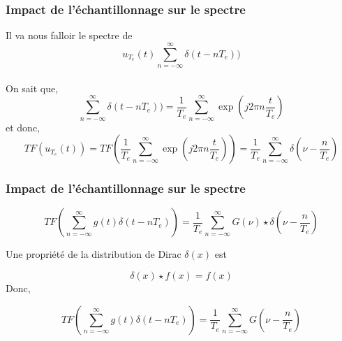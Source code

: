 \documentclass{beamer}
\begin{document}
\begin{frame}
\frametitle{Impact de l'échantillonnage sur le spectre}

Il va nous falloir le spectre de \[u_{T_e}(t) \sum_{n = -\infty}^{\infty} \delta(t-nT_e))\]
\\
\vspace{0.2cm}
On sait que,
 \[  \sum_{n = -\infty}^{\infty} \delta(t-nT_e)) =  \frac{1}{T_e}\sum_{n = -\infty}^{\infty} \exp(j2\pi n \frac{t}{T_e}) \]
et donc,
 \[ TF(u_{T_e}(t)) =  TF(\frac{1}{T_e}\sum_{n = -\infty}^{\infty} \exp(j2\pi n \frac{t}{T_e})) =  \frac{1}{T_e}\sum_{n = -\infty}^{\infty} \delta(\nu - \frac{n}{T_e}) \] 
 

\end{frame}



\begin{frame}
\frametitle{Impact de l'échantillonnage sur le spectre}


\[ TF (\sum_{n = -\infty}^{\infty} g(t)\delta(t-nT_e)) = \frac{1}{T_e}\sum_{n = -\infty}^{\infty} G(\nu) \star \delta(\nu - \frac{n}{T_e}) \] 

Une propriété de la distribution de Dirac $\delta(x)$ est

\[\delta(x) \star f(x) = f(x) \]
Donc, 

\[ TF (\sum_{n = -\infty}^{\infty} g(t)\delta(t-nT_e)) = \frac{1}{T_e}\sum_{n = -\infty}^{\infty} G(\nu - \frac{n}{T_e}) \] 

\end{frame}
\end{document}
